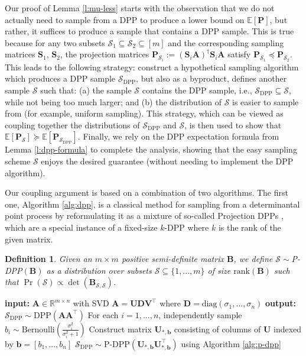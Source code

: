 \documentclass[11pt]{article}
\let\origtop\top
\renewcommand\top{{\scriptscriptstyle{\origtop}}}
\def\diag{\mathrm{diag}}
\def\DPP{\mathrm{DPP}}
\def\b{{\mathbf b}}
\def\A{{\mathbf A}}
\def\B{{\mathbf B}}
\def\S{{\mathbf S}}
\def\D{{\mathbf D}}
\def\setS{{\mathcal S}}
\def\V{{\mathbf V}}
\def\P{{\mathbf P}}
\def\E{{\mathds E}}
\def\R{{\mathbf R}}
\def\U{{\mathbf U}}
\def\R{{\mathds R}}
\newtheorem{dfn}[thm]{Definition}
\begin{document}
Our proof of Lemma \ref{l:mu-less} starts with the observation that we do not actually need to sample from a DPP to produce a lower bound on $\E[\P]$, but rather, it suffices to produce a sample that contains a DPP sample. This is true because for any two subsets $\setS_1 \subseteq \setS_2 \subseteq [m]$ and the corresponding sampling matrices $\S_1$, $\S_2$, the projection matrices $\P_{\setS_i} := (\S_i\A)^\dagger\S_i\A$ satisfy $\P_{\setS_1} \preceq \P_{\setS_2}$. This leads to the following strategy: construct a hypothetical sampling algorithm which produces a DPP sample $\setS_{\DPP}$, but also as a byproduct, defines another sample $\setS$ such that: (a) the sample $\setS$ contains the DPP sample, i.e., $\setS_{\DPP}\subseteq \setS$, while not being too much larger; and (b) the distribution of $\setS$ is easier to sample from (for example, uniform sampling). This strategy, which can be viewed as coupling together the distributions of $\setS_{\DPP}$ and $\setS$, is then used to show that $\E[\P_{\setS}]\succeq\E[\P_{\setS_{\DPP}}]$. Finally, we rely on the DPP expectation formula from Lemma \ref{l:dpp-formula} to complete the analysis, showing that the easy sampling scheme $\setS$ enjoys the desired guarantee (without needing to implement the DPP algorithm). 

Our coupling argument is based on a combination of two algorithms. The first one, Algorithm \ref{alg:dpp}, is a classical method for sampling from a determinantal point process by reformulating it as a mixture of so-called Projection DPPs \cite{kulesza2012determinantal}, which are a special instance of a fixed-size $k$-DPP where $k$ is the rank of the given matrix.

\begin{dfn}
Given an $m\times m$ positive semi-definite matrix $\B$, we define $\setS\sim $\textnormal{P-DPP}$(\B)$ as a distribution over subsets $\setS\subseteq\{1,...,m\}$ of size $\mathrm{rank}(\B)$ such that $\Pr(\setS)\propto \det(\B_{\setS,\setS})$.
\end{dfn}\vspace{-2mm}
\begin{algorithm}
\caption{Random-sized DPP sampler (Algorithm 1 from \cite{kulesza2012determinantal})}\label{alg:dpp}
  \begin{algorithmic}[1]
    \State \textbf{input:} $\A\in\R^{m\times n}$ with SVD $\A=\U\D\V^\top$ where $\D=\diag(\sigma_1,...,\sigma_n)$
    \State \textbf{output:} $\setS_{\DPP}\sim $DPP$(\A\A^\top)$ 
    \State For each $i=1,...,n$, independently sample $b_i\sim \mathrm{Bernoulli}(\frac{\sigma_i^2}{\sigma_i^2+1})$
    \State Construct matrix $\U_{*,\b}$ consisting of columns of $\U$ indexed by $\b=[b_1,...,b_n]$
    \State \Return $\setS_{\DPP}\sim $P-DPP$(\U_{*,\b}\U_{*,\b}^\top)$ using Algorithm \ref{alg:p-dpp}
  \end{algorithmic}
\end{algorithm}
\end{document}
